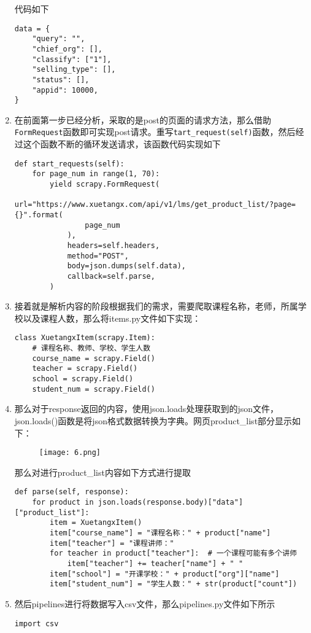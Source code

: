 \documentclass[lang=cn,11pt,a4paper]{elegantpaper}
\begin{document}
\begin{enumerate}
    代码如下
    \begin{lstlisting}
data = {
    "query": "",
    "chief_org": [],
    "classify": ["1"],
    "selling_type": [],
    "status": [],
    "appid": 10000,
}
    \end{lstlisting}
    \item 在前面第一步已经分析，采取的是post的页面的请求方法，那么借助\lstinline{FormRequest}函数即可实现post请求。重写\lstinline{tart_request(self)}函数，然后经过这个函数不断的循环发送请求，该函数代码实现如下
    \begin{lstlisting}
def start_requests(self):
    for page_num in range(1, 70):
        yield scrapy.FormRequest(
            url="https://www.xuetangx.com/api/v1/lms/get_product_list/?page={}".format(
                page_num
            ),
            headers=self.headers,
            method="POST",
            body=json.dumps(self.data),
            callback=self.parse,
        )
    \end{lstlisting}
    \item 接着就是解析内容的阶段根据我们的需求，需要爬取课程名称，老师，所属学校以及课程人数，那么将items.py文件如下实现：
    \begin{lstlisting}
class XuetangxItem(scrapy.Item):
    # 课程名称、教师、学校、学生人数
    course_name = scrapy.Field()
    teacher = scrapy.Field()
    school = scrapy.Field()
    student_num = scrapy.Field()
    \end{lstlisting}
    \item 那么对于response返回的内容，使用json.loads处理获取到的json文件，json.loads()函数是将json格式数据转换为字典。网页product\_list部分显示如下：
    \begin{figure}[!htb]
    \centering
    \texttt{[image: 6.png]}
    \end{figure}
    
    那么对进行product\_list内容如下方式进行提取
    \begin{lstlisting}
def parse(self, response):
    for product in json.loads(response.body)["data"]["product_list"]:
        item = XuetangxItem()
        item["course_name"] = "课程名称：" + product["name"]
        item["teacher"] = "课程讲师："
        for teacher in product["teacher"]:  # 一个课程可能有多个讲师
            item["teacher"] += teacher["name"] + " "
        item["school"] = "开课学校：" + product["org"]["name"]
        item["student_num"] = "学生人数：" + str(product["count"])
    \end{lstlisting}
    \item 然后pipelines进行将数据写入csv文件，那么pipelines.py文件如下所示
    \begin{lstlisting}
import csv


\end{lstlisting}
\end{enumerate}
\end{document}
